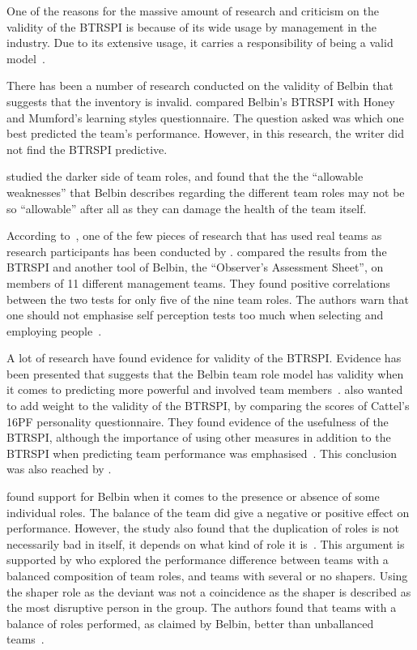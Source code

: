 \documentclass[a4paper,12pt,titlepage]{report}
\begin{document}
  One of the reasons for the massive amount of research and criticism on the validity
  of the BTRSPI is because of its wide usage by management in the industry. Due to
  its extensive usage, it carries a responsibility of being a valid
  model~\cite[261]{afhsdp}.

  There has been a number of research conducted on the validity of
  Belbin that suggests that the inventory is invalid.
  \citet{cj} compared Belbin's BTRSPI with Honey and Mumford's learning
  styles questionnaire. The question asked was which one best predicted the
  team's performance. However, in this research, the writer did not find
  the BTRSPI predictive.

  \citet{wmdh} studied the darker side of team roles, and found that the
  the ``allowable weaknesses'' that Belbin describes regarding the different
  team roles may not be so ``allowable'' after all as they can damage
  the health of the team itself.

  According to~\citet{dphh}, one
  of the few pieces of research that has used real teams as research participants
  has been conducted by \citet{bsss}.
  \citet{bsss} compared the results from the BTRSPI and
  another tool of Belbin, the ``Observer's Assessment Sheet'', on members of
  11 different management teams. They found positive correlations between the
  two tests for only five of the nine team roles. The authors warn
  that one should not emphasise self perception tests too much
  when selecting and employing people~\cite[1-7]{bsss}. 

  A lot of research have found evidence for validity of the BTRSPI. Evidence
  has been presented that suggests that the Belbin team role model has validity when
  it comes to predicting more powerful and involved team members~\cite[586]{sfwmjs}.
  \citet{sfwmgs} also wanted to add weight to the validity of the BTRSPI,
  by comparing the scores of Cattel's 16PF personality questionnaire. They
  found evidence of the usefulness of the BTRSPI, although 
  the importance of using other measures in addition to the BTRSPI
  when predicting team performance was emphasised~\cite[67]{sfwmgs}.
  This conclusion was also reached by \citet{sfwmjw}.

  \citet{dphh} found support for Belbin when it comes to the presence or
  absence of some individual roles. The balance of the team did give a negative
  or positive effect on performance. However, the study also found that the duplication
  of roles is not necessarily bad in itself, it depends on what kind of
  role it is~\cite[703]{dphh}. This argument is supported by \citet{jpns} who explored
  the performance difference between teams with a balanced composition of team roles,
  and teams with several or no shapers. Using the shaper role as the deviant was not
  a coincidence as the shaper is described as the most disruptive person
  in the group. The authors found that teams with a balance of roles performed, as
  claimed by Belbin, better than unballanced teams~\cite[654]{jpns}.
\end{document}
